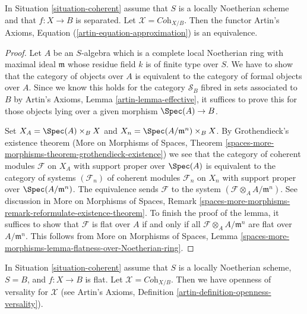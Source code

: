 \begin{lemma}
\label{lemma-coherent-existence}
In Situation \ref{situation-coherent} assume that $S$ is a locally Noetherian
scheme and that $f : X \to B$ is separated.
Let $\mathcal{X} = \textit{Coh}_{X/B}$. Then the functor
Artin's Axioms, Equation (\ref{artin-equation-approximation})
is an equivalence.
\end{lemma}

\begin{proof}
Let $A$ be an $S$-algebra which is a complete local Noetherian ring
with maximal ideal $\mathfrak m$
whose residue field $k$ is of finite type over $S$.
We have to show that the category of objects over $A$ is
equivalent to the category of formal objects over $A$.
Since we know this holds for the category $\mathcal{S}_B$
fibred in sets associated to $B$ by Artin's Axioms, 
Lemma \ref{artin-lemma-effective}, it suffices to prove this
for those objects lying over a given morphism $\Spec(A) \to B$.

\medskip\noindent
Set $X_A = \Spec(A) \times_B X$ and $X_n = \Spec(A/\mathfrak m^n) \times_B X$.
By Grothendieck's existence theorem
(More on Morphisms of Spaces, Theorem
\ref{spaces-more-morphisms-theorem-grothendieck-existence})
we see that the category of coherent modules $\mathcal{F}$
on $X_A$ with support proper over $\Spec(A)$ is equivalent
to the category of systems $(\mathcal{F}_n)$ of coherent modules
$\mathcal{F}_n$ on $X_n$ with support proper over
$\Spec(A/\mathfrak m^n)$. The equivalence sends $\mathcal{F}$
to the system $(\mathcal{F} \otimes_A A/\mathfrak m^n)$. See discussion in
More on Morphisms of Spaces, Remark
\ref{spaces-more-morphisms-remark-reformulate-existence-theorem}.
To finish the proof of the lemma, it suffices to show that
$\mathcal{F}$ is flat over $A$ if and only if all
$\mathcal{F} \otimes_A A/\mathfrak m^n$ are flat over $A/\mathfrak m^n$.
This follows from
More on Morphisms of Spaces, Lemma
\ref{spaces-more-morphisms-lemma-flatness-over-Noetherian-ring}.
\end{proof}

\begin{lemma}
\label{lemma-coherent-defo-thy}
In Situation \ref{situation-coherent} assume that
$S$ is a locally Noetherian scheme, $S = B$, and $f : X \to B$ is flat.
Let $\mathcal{X} = \textit{Coh}_{X/B}$. Then we have openness of
versality for $\mathcal{X}$ (see
Artin's Axioms, Definition \ref{artin-definition-openness-versality}).
\end{lemma}

